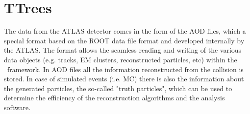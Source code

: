 \begin{figure}
\end{figure}

\section{TTrees}
\label{sec:ZeeD_TTrees}

The data from the ATLAS detector comes in the form of the AOD files, which a special format based on the ROOT data file format and developed internally by the ATLAS. The format allows the seamless reading and writing of the various data objects (e.g. tracks, EM clusters, reconstructed particles, etc) within the \Athena\ framework. In AOD files all the information reconstructed from the collision is stored. In case of simulated events (i.e. MC) there is also the information about the generated particles, the so-called "truth particles", which can be used to determine the efficiency of the reconstruction algorithms and the analysis software.


